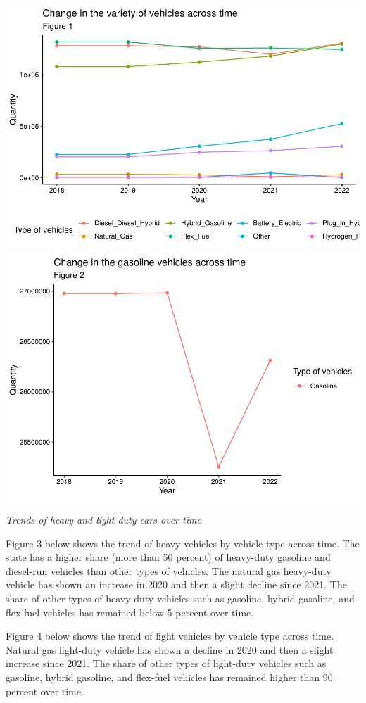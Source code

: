 \documentclass[
  12pt,
]{article}
\begin{document}
\includegraphics{Code_Main-Markdown_files/figure-latex/unnamed-chunk-3-1.pdf}
\includegraphics{Code_Main-Markdown_files/figure-latex/unnamed-chunk-3-2.pdf}

\emph{Trends of heavy and light duty cars over time}

Figure 3 below shows the trend of heavy vehicles by vehicle type across
time. The state has a higher share (more than 50 percent) of heavy-duty
gasoline and diesel-run vehicles than other types of vehicles. The
natural gas heavy-duty vehicle has shown an increase in 2020 and then a
slight decline since 2021. The share of other types of heavy-duty
vehicles such as gasoline, hybrid gasoline, and flex-fuel vehicles has
remained below 5 percent over time.

Figure 4 below shows the trend of light vehicles by vehicle type across
time. Natural gas light-duty vehicle has shown a decline in 2020 and
then a slight increase since 2021. The share of other types of
light-duty vehicles such as gasoline, hybrid gasoline, and flex-fuel
vehicles has remained higher than 90 percent over time.
\end{document}
